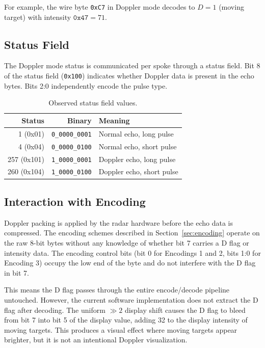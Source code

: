 \documentclass[11pt,letterpaper]{article}
\begin{document}
For example, the wire byte \texttt{0xC7} in Doppler mode decodes to $D = 1$ (moving target) with intensity $\texttt{0x47} = 71$.

\subsection{Status Field}

The Doppler mode status is communicated per spoke through a status field. Bit 8 of the status field (\texttt{0x100}) indicates whether Doppler data is present in the echo bytes. Bits 2:0 independently encode the pulse type.

\begin{table}[H]
\centering
\caption{Observed status field values.}
\label{tab:status}
\begin{tabular}{@{}rrl@{}}
\toprule
\textbf{Status} & \textbf{Binary} & \textbf{Meaning} \\
\midrule
1 (0x01)   & \texttt{0\_0000\_0001} & Normal echo, long pulse \\
4 (0x04)   & \texttt{0\_0000\_0100} & Normal echo, short pulse \\
257 (0x101) & \texttt{1\_0000\_0001} & Doppler echo, long pulse \\
260 (0x104) & \texttt{1\_0000\_0100} & Doppler echo, short pulse \\
\bottomrule
\end{tabular}
\end{table}

\subsection{Interaction with Encoding}

Doppler packing is applied by the radar hardware before the echo data is compressed. The encoding schemes described in Section~\ref{sec:encoding} operate on the raw 8-bit bytes without any knowledge of whether bit 7 carries a D flag or intensity data. The encoding control bits (bit 0 for Encodings 1 and 2, bits 1:0 for Encoding 3) occupy the low end of the byte and do not interfere with the D flag in bit 7.

This means the D flag passes through the entire encode/decode pipeline untouched. However, the current software implementation does not extract the D flag after decoding. The uniform $\gg 2$ display shift causes the D flag to bleed from bit 7 into bit 5 of the display value, adding 32 to the display intensity of moving targets. This produces a visual effect where moving targets appear brighter, but it is not an intentional Doppler visualization.
\end{document}
